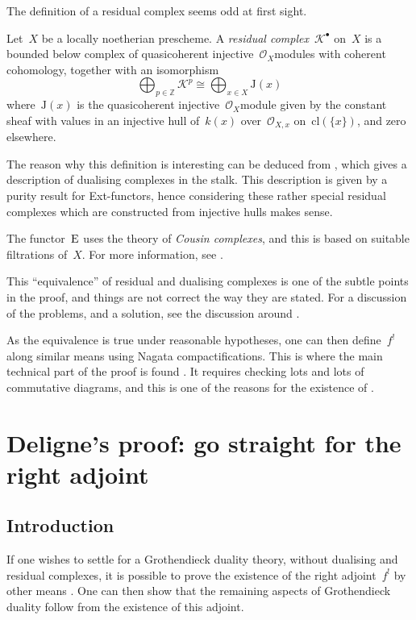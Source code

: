 \documentclass[10pt,a4paper]{article}
\begin{document}
The definition of a residual complex seems odd at first sight.
\begin{definition}
  Let~$X$ be a locally noetherian prescheme. A \emph{residual complex}~$\mathcal{K}^\bullet$ on~$X$ is a bounded below complex of quasicoherent injective~$\mathcal{O}_X$\dash modules with coherent cohomology, together with an isomorphism
  \begin{equation}
    \bigoplus_{p\in\mathbb{Z}}\mathcal{K}^p\cong\bigoplus_{x\in X}\mathrm{J}(x)
  \end{equation}
  where~$\mathrm{J}(x)$ is the quasicoherent injective~$\mathcal{O}_X$\dash module given by the constant sheaf with values in an injective hull of~$k(x)$ over~$\mathcal{O}_{X,x}$ on~$\mathrm{cl}(\{x\})$, and zero elsewhere.
\end{definition}
The reason why this definition is interesting can be deduced from \cite[proposition V.3.4]{hartshorne-residues-and-duality}, which gives a description of dualising complexes in the stalk. This description is given by a purity result for Ext-functors, hence considering these rather special residual complexes which are constructed from injective hulls makes sense.

The functor~$\operatorname{E}$ uses the theory of \emph{Cousin complexes}, and this is based on suitable filtrations of~$X$. For more information, see \cite[chapter IV]{hartshorne-residues-and-duality}.

This ``equivalence'' of residual and dualising complexes is one of the subtle points in the proof, and things are not correct the way they are stated. For a discussion of the problems, and a solution, see the discussion around \cite[lemma 3.2.1]{conrad-grothendieck-duality-and-base-change}.

As the equivalence is true under reasonable hypotheses, one can then define~$f^!$ along similar means using Nagata compactifications. This is where the main technical part of the proof is found \cite[\S VI.2--VI.5]{hartshorne-residues-and-duality}. It requires checking lots and lots of commutative diagrams, and this is one of the reasons for the existence of \cite{conrad-grothendieck-duality-and-base-change}.


\section{Deligne's proof: go straight for the right adjoint}
\label{section:deligne}
\subsection{Introduction}
If one wishes to settle for a Grothendieck duality theory, without dualising and residual complexes, it is possible to prove the existence of the right adjoint~$f^!$ by other means \cite{deligne-appendix-f-upper-shriek,verdier-base-change-twisted-inverse-image}. One can then show that the remaining aspects of Grothendieck duality follow from the existence of this adjoint.
\end{document}
